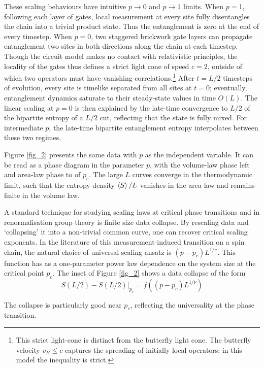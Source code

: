 \documentclass[10pt]{article}
\begin{document}
These scaling behaviours have intuitive $p \rightarrow 0$ and $p\rightarrow1$ limits. When $p=$1, following each layer of gates, local measurement at every site fully disentangles the chain into a trivial product state. Thus the entanglement is zero at the end of every timestep. When $p=0$, two staggered brickwork gate layers can propagate entanglement two sites in both directions along the chain at each timestep. Though the circuit model makes no contact with relativistic principles, the locality of the gates thus defines a strict light cone of speed $c=2$, outside of which two operators must have vanishing correlations.\footnote{This strict light-cone is distinct from the butterfly light cone. The butterfly velocity $v_B \leq c$ captures the spreading of initially local operators; in this model the inequality is strict.} After $t=L/2$ timesteps of evolution, every site is timelike separated from all sites at $t=0$; eventually, entanglement dynamics saturate to their steady-state values in time $O(L)$. The linear scaling at $p=0$ is then explained by the late-time convergence to $L/2$ of the bipartite entropy of a $L/2$ cut, reflecting that the state is fully mixed. For intermediate $p$, the late-time bipartite entanglement entropy interpolates between these two regimes.

Figure \ref{fig_2} presents the same data with $p$ as the independent variable. It can be read as a phase diagram in the parameter $p$, with the volume-law phase left and area-law phase to of $p_c$. The large $L$ curves converge in the thermodynamic limit, such that the entropy density $\ev{S}/L$ vanishes in the area law and remains finite in the volume law. 

A standard technique for studying scaling laws at critical phase transitions and in renormalisation group theory is finite size data collapse. By rescaling data and `collapsing' it into a non-trivial common curve, one can recover critical scaling exponents. In the literature of this measurement-induced transition on a spin chain, the natural choice of universal scaling ansatz is $(p-p_c) L^{1/\nu}$. This function has as a one-parameter power law dependence on the system size at the critical point $p_c$. The inset of Figure \ref{fig_2} shows a data collapse of the form
\begin{equation}
S(L/2) - S(L/2)\big|_{p_c} = f\left((p-p_c)L^{1/\nu}\right)
\end{equation}

The collapse is particularly good near $p_c$, reflecting the universality at the phase transition.
\end{document}
